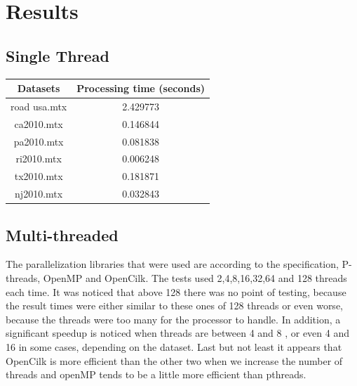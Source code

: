 \documentclass[11pt]{article}
\begin{document}
\section{Results}
\label{sec:orgfe8c8cb}
\subsection{Single Thread}
\label{sec:org3dd1f4f}
\begin{center}
\begin{tabular}{|c|c|}
\hline
Datasets & Processing time (seconds)\\[0pt]
\hline
road usa.mtx & 2.429773\\[0pt]
ca2010.mtx & 0.146844\\[0pt]
pa2010.mtx & 0.081838\\[0pt]
ri2010.mtx & 0.006248\\[0pt]
tx2010.mtx & 0.181871\\[0pt]
nj2010.mtx & 0.032843\\[0pt]
\hline
\end{tabular}
\end{center}
\subsection{Multi-threaded}
\label{sec:orgf9463c5}
The parallelization libraries that were used are according to the specification, P-threads, OpenMP and OpenCilk. The tests used 2,4,8,16,32,64 and 128 threads each time. It was noticed that above 128 there was no point of testing, because the result times were either similar to these ones of 128 threads or even worse, because the threads were too many for the processor to handle. In addition, a significant speedup is noticed when threads are between 4 and 8 , or even 4 and 16 in some cases, depending on the dataset. Last but not least it appears that OpenCilk is more efficient than the other two when we increase the number of threads and openMP tends to be a little more efficient than pthreads.
\pagebreak
\end{document}
